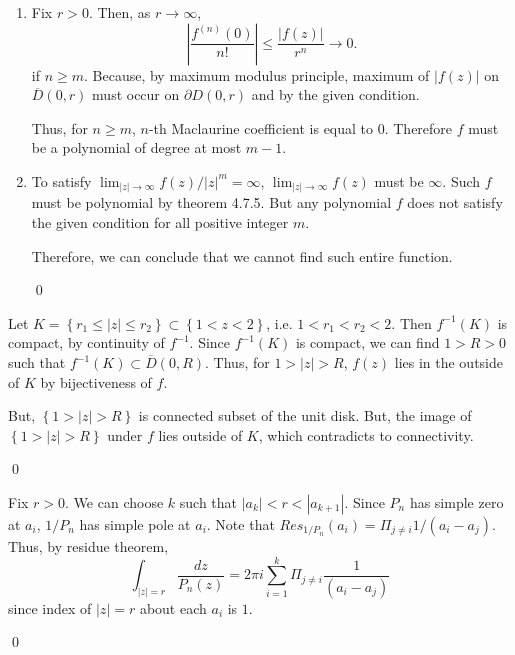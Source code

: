 \begin{problem}[2]\hfill

	\begin{enumerate}
		\item Fix $r>0$. Then, as $r \rightarrow \infty$,
			\[
				\left | \frac{f^{(n)}(0)}{n!} \right | \leq \frac{|f(z)|}{r^n} \rightarrow 0.
			\]
			if $n \geq m$.
			Because, by maximum modulus principle, maximum of $|f(z)|$ on $\overline{D}(0, r)$ must occur on $\partial D(0, r)$ and by the given condition.
			
			Thus, for $n\geq m$, $n$-th Maclaurine coefficient is equal to $0$. Therefore $f$ must be a polynomial of degree at most $m-1$.

		\item To satisfy $\lim_{|z| \rightarrow \infty}f(z)/|z|^m = \infty$, $\lim_{|z| \rightarrow \infty}f(z)$ must be $\infty$.
			Such $f$ must be polynomial by theorem 4.7.5. But any polynomial $f$ does not satisfy the given condition for all positive integer $m$.

			Therefore, we can conclude that we cannot find such entire function.

			\qed

	\end{enumerate}
	
\end{problem}

\begin{problem}[4]\hfill

	Let $K = \left\{ r_1 \leq |z| \leq r_2 \right\} \subset \left\{ 1 < z < 2 \right\}$, i.e. $1<r_1 < r_2 < 2$.
	Then $f^{-1}(K)$ is compact, by continuity of $f^{-1}$.
	Since $f^{-1}(K)$ is compact, we can find $1>R>0$ such that $f^{-1}(K) \subset \overline{D}(0, R)$.
	Thus, for $1>|z|>R$, $f(z)$ lies in the outside of $K$ by bijectiveness of $f$.
	
	But, $\left\{1> |z| > R \right\}$ is connected subset of the unit disk.
	But, the image of $\left\{ 1>|z|>R \right\}$ under $f$ lies outside of $K$, which contradicts to connectivity.
	
	\qed
\end{problem}

\begin{problem}[5] \hfill
	
	Fix $r>0$. We can choose $k$ such that $|a_k|<r<|a_{k+1}|$.
	Since $P_n$ has simple zero at $a_i$, $1/P_n$ has simple pole at $a_i$.
	Note that $Res_{1/P_n}(a_i) = \Pi_{j \ne i}1/(a_i - a_j)$.
	Thus, by residue theorem,
	\[
		\int_{|z| = r}\frac{dz}{P_n(z)} = 2\pi i \sum_{i=1}^k \Pi_{j \ne i} \frac{1}{(a_i - a_j)}
	\]
	since index of $|z| = r$ about each $a_i$ is $1$.

	\qed
\end{problem}

